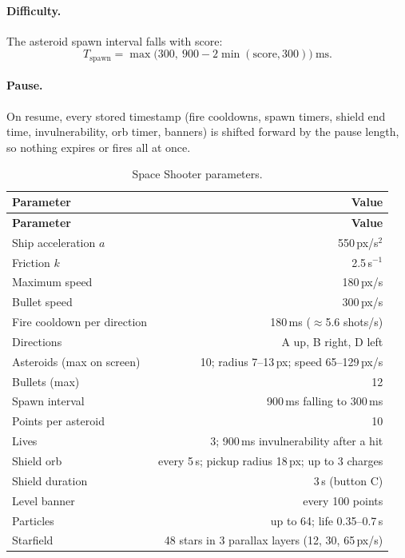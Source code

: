 \documentclass[11pt,a4paper]{article}
\begin{document}
\paragraph{Difficulty.} The asteroid spawn interval falls with score:
\[
  T_{\text{spawn}} = \max\big(300,\ 900 - 2\min(\text{score}, 300)\big)\ \text{ms}.
\]

\paragraph{Pause.} On resume, every stored timestamp (fire cooldowns, spawn
timers, shield end time, invulnerability, orb timer, banners) is shifted forward
by the pause length, so nothing expires or fires all at once.

\begin{longtable}{lr}
\caption{Space Shooter parameters.}\label{tab:shooterparams}\\
\toprule
\textbf{Parameter} & \textbf{Value} \\
\midrule\endfirsthead
\toprule
\textbf{Parameter} & \textbf{Value} \\
\midrule\endhead
Ship acceleration $a$ & 550\,px/s$^2$ \\
Friction $k$ & 2.5\,s$^{-1}$ \\
Maximum speed & 180\,px/s \\
Bullet speed & 300\,px/s \\
Fire cooldown per direction & 180\,ms ($\approx$5.6 shots/s) \\
Directions & A up, B right, D left \\
Asteroids (max on screen) & 10; radius 7--13\,px; speed 65--129\,px/s \\
Bullets (max) & 12 \\
Spawn interval & 900\,ms falling to 300\,ms \\
Points per asteroid & 10 \\
Lives & 3; 900\,ms invulnerability after a hit \\
Shield orb & every 5\,s; pickup radius 18\,px; up to 3 charges \\
Shield duration & 3\,s (button C) \\
Level banner & every 100 points \\
Particles & up to 64; life 0.35--0.7\,s \\
Starfield & 48 stars in 3 parallax layers (12, 30, 65\,px/s) \\
\bottomrule
\end{longtable}
\end{document}
